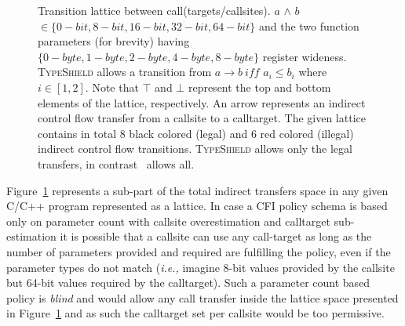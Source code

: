 \begin{figure}[h!]
{

}
\caption{Transition lattice between call(targets/callsites).
$a$ $\wedge$ $b$ $\in \{0-bit, 8-bit, 16-bit, 32-bit, 64-bit\}$ and the two 
function parameters (for brevity) having $\{0-byte, 1-byte, 2-byte, 4-byte, 8-byte\}$ register wideness. 
\textsc{TypeShield} allows a transition from $a \rightarrow b \ iff$ $a_{i} \le b_{i}$ where $i \in [1, 2]$.
Note that $\top$ and $\bot$ represent the top and bottom elements of the lattice, respectively.
An arrow represents an indirect control flow transfer from a callsite to a calltarget. 
The given lattice contains in total 8 black colored (legal) and 6 red colored (illegal) indirect control flow transitions. 
\textsc{TypeShield} allows only the legal transfers, in contrast~\cite{veen:typearmor} allows all.}
\label{fig:lattice3264}
\end{figure}

Figure~\ref{fig:lattice3264} represents
a sub-part of the total indirect transfers space in any given C/C++ program represented as a lattice. 
In case a CFI policy schema is based only on parameter count with callsite overestimation and calltarget sub-estimation 
it is possible that a callsite can use any call-target as long as the number of 
parameters provided and required are fulfilling the policy, even if the parameter types do not match 
(\textit{i.e.,} imagine 8-bit values provided by the callsite but 64-bit values required by the calltarget). 
Such a parameter count based policy is \textit{blind} and would allow any call transfer 
inside the lattice space presented in Figure~\ref{fig:lattice3264} and as such the calltarget set per 
callsite would be too permissive.

